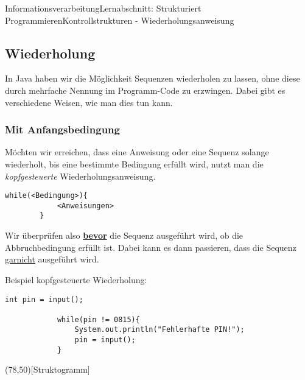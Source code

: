 \documentclass[11pt,oneside,openany,headings=optiontotoc,11pt,numbers=noenddot]{article}
\begin{document}
	\begin{worksheet}{Informationsverarbeitung}{Lernabschnitt: Strukturiert Programmieren}{Kontrollstrukturen - Wiederholungsanweisung}
		\setlength{\columnseprule}{0pt}
		\noindent
		\setcounter{section}{6}
		\setcounter{page}{24}
		\setcounter{subsection}{3}
		\vspace*{-35pt}
		\subsection{Wiederholung}
		In Java haben wir die Möglichkeit Sequenzen wiederholen zu lassen, ohne diese durch mehrfache Nennung im Programm-Code zu erzwingen. Dabei gibt es verschiedene Weisen, wie man dies tun kann.
		\subsubsection{Mit Anfangsbedingung}
		\label{anfb}
		Möchten wir erreichen, dass eine Anweisung oder eine Sequenz solange wiederholt, bis eine bestimmte Bedingung erfüllt wird, nutzt man die \textit{kopfgesteuerte} Wiederholungsanweisung.
		\begin{lstlisting}[style=Python]
		while(<Bedingung>){
			<Anweisungen>
		}
		\end{lstlisting}
		\par\noindent
		Wir überprüfen also \underline{\textbf{bevor}} die Sequenz ausgeführt wird, ob die Abbruchbedingung erfüllt ist. Dabei kann es dann passieren, dass die Sequenz \underline{garnicht} ausgeführt wird.
		\par\noindent
		\begin{minipage}[t]{0.48\textwidth}
			\vspace*{0pt}
			Beispiel kopfgesteuerte Wiederholung:
			\begin{lstlisting}[style=Python,frame=single]
			int pin = input();
			
			while(pin != 0815){
				System.out.println("Fehlerhafte PIN!");
				pin = input();
			}
			\end{lstlisting}
		\end{minipage}
		\hfill
		\begin{minipage}[t]{0.48\textwidth}
			\vspace*{0pt}
			\begin{struktogramm}(78,50)[Struktogramm]
				\whileend
			\end{struktogramm}
		\end{minipage}
		\vspace*{-50pt}

\end{worksheet}
\end{document}

